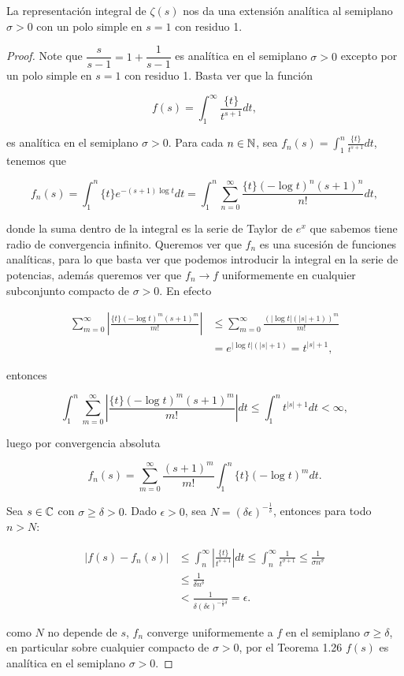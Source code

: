 \begin{theorem}
La representación integral de $\zeta(s)$ nos da una extensión analítica al semiplano $\sigma>0$ con un polo simple en $s=1$ con residuo 1.
\end{theorem}

\begin{proof}
Note que $\dfrac{s}{s-1}=1+\dfrac{1}{s-1}$ es analítica en el semiplano $\sigma>0$ excepto por un polo simple en $s=1$ con residuo 1. Basta ver que la función

$$f(s)=\int_1^{\infty}\frac{\{t\}}{t^{s+1}}dt,$$

es analítica en el semiplano $\sigma>0$. Para cada $n\in \mathbb{N}$, sea $f_n(s)=\displaystyle\int_1^{n}\frac{\{t\}}{t^{s+1}}dt$, tenemos que

$$f_n(s)=\int_1^{n}\{t\}e^{\displaystyle-(s+1)\log t}dt=\int_1^{n}\sum_{n=0}^{\infty}\frac{\{t\}(-\log t)^n(s+1)^n}{n!}dt,$$

donde la suma dentro de la integral es la serie de Taylor de $e^x$ que sabemos tiene radio de convergencia infinito. Queremos ver que $f_n$ es una sucesión de funciones analíticas, para lo que basta ver que podemos introducir la integral en la serie de potencias, además queremos ver que $f_n\to f$ uniformemente en cualquier subconjunto compacto de $\sigma>0$. En efecto

$$\begin{aligned}
\sum_{m=0}^{\infty}\left|\frac{\{t\}(-\log t)^m(s+1)^m}{m!}\right| & \leq \sum_{m=0}^{\infty} \frac{(|\log t|(|s|+1))^m}{m!} \\
& =e^{\displaystyle\left| \log t\right|(|s|+1)}=t^{|s|+1},
\end{aligned}$$

entonces 

$$\int_1^n \sum_{m=0}^{\infty}\left|\frac{\{t\}(-\log t)^m(s+1)^m}{m!}\right| d t \leq \int_1^n t^{|s|+1} d t<\infty,$$

luego por convergencia absoluta

$$f_n(s)=\sum_{m=0}^{\infty} \frac{(s+1)^m}{m!} \int_1^n\{t\}(-\log t)^m d t.$$

Sea $s\in \mathbb{C}$ con $\sigma\geq\delta>0$. Dado $\epsilon>0$, sea $N=(\delta\epsilon)^{-\frac{1}{\delta}}$, entonces para todo $n>N$:

\begin{align*}
\left|f(s)-f_n(s)\right| &\leq \int_n^{\infty} \left|\frac{\{t\}}{t^{s+1}}\right| d t \leq \int_n^{\infty}\frac{1}{t^{\sigma+1}}\leq \frac{1}{\sigma n^\sigma}\\
&\leq \frac{1}{\delta n^\delta}\\
&<\frac{1}{\delta(\delta\epsilon)^{-\frac{1}{\delta}\delta}}=\epsilon.
\end{align*}

como $N$ no depende de $s$, $f_n$ converge uniformemente a $f$ en el semiplano $\sigma\geq\delta$, en particular sobre cualquier compacto de $\sigma>0$, por el Teorema 1.26 $f(s)$ es analítica en el semiplano $\sigma>0$.
\end{proof}

